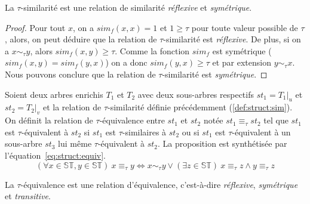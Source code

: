 \begin{proposition}
    La $\tau$-similarité est une relation de similarité \emph{réflexive} et \emph{symétrique}.
\end{proposition}

\begin{proof}
    Pour tout $x$, on a $sim_f(x, x) = 1$ et $1 \ge \tau$ pour toute valeur possible de $\tau$, alors, on peut déduire que la relation de $\tau$-similarité est \emph{réflexive}.
    De plus, si on a $x \sim_\tau y$, alors $sim_f(x, y) \ge \tau$.
    Comme la fonction $sim_f$ est symétrique ($sim_f(x, y) = sim_f(y, x)$) on a donc $sim_f(y, x) \ge \tau$ et par extension $y \sim_\tau x$.
    Nous pouvons conclure que la relation de $\tau$-similarité est \emph{symétrique}.
\end{proof}

\begin{definition}
    \label{def:struct:equiv}
    Soient deux arbres enrichis $T_1$ et $T_2$ avec deux sous-arbres respectifs $st_1 = T_1|_u$ et $st_2 = T_2|_v$ et la relation de $\tau$-similarité définie précédemment (\ref{def:struct:sim}).
    On définit la relation de $\tau$-équivalence entre $st_1$ et $st_2$ notée $st_1 \equiv_\tau st_2$ tel que $st_1$ est $\tau$-équivalent à $st_2$ si $st_1$ est $\tau$-similaires à $st_2$ ou si $st_1$ est  $\tau$-équivalent à un sous-arbre $st_3$ lui même $\tau$-équivalent à $st_2$.
    La proposition est synthétisée par l'équation~\ref{eq:struct:equiv}.
    \begin{equation}
        (\forall x \in \mathbb{ST}, y \in \mathbb{ST}) ~ x \equiv_\tau y \iff x \sim_\tau y \lor (\exists z \in \mathbb{ST}) ~ x \equiv_\tau z \land y \equiv_\tau z \label{eq:struct:equiv}
    \end{equation}
\end{definition}

\begin{proposition}
    La $\tau$-équivalence est une relation d'équivalence, c'est-à-dire \emph{réflexive}, \emph{symétrique} et \emph{transitive}.
\end{proposition}

